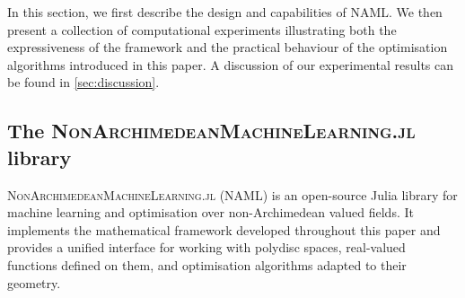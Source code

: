 \documentclass[10pt]{article}
\theoremstyle{definition}
\begin{document}
In this section, we first describe the design and capabilities of NAML. We then present a collection of computational experiments illustrating both the expressiveness of the framework and the practical behaviour of the optimisation algorithms introduced in this paper. A discussion of our experimental results can be found in \cref{sec:discussion}.

\subsection{The \textsc{NonArchimedeanMachineLearning.jl} library}


\textsc{NonArchimedeanMachineLearning.jl} (NAML) is an open-source Julia library for machine learning and optimisation over non-Archimedean valued fields. It implements the mathematical framework developed throughout this paper and provides a unified interface for working with polydisc spaces, real-valued functions defined on them, and optimisation algorithms adapted to their geometry.
\end{document}
